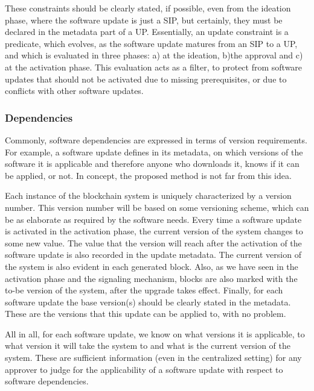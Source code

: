 These constraints should be clearly stated, if possible, even from the ideation phase, where the software update is just a SIP, but certainly, they must be declared in the metadata part of a UP. Essentially, an update  constraint is a predicate, which evolves, as the software update matures from an SIP to a UP,  and which is evaluated in three phases: a) at the ideation, b)the approval and c) at the activation phase. This evaluation acts as a filter, to protect from software updates that should not be activated due to missing prerequisites, or due to conflicts with other software updates.

\subsubsection{Dependencies}
Commonly, software dependencies are expressed in terms of version requirements. For example, a software update defines in its metadata, on which versions of the software it is applicable and therefore anyone who downloads it, knows if it can be applied, or not. In concept, the proposed method is not far from this idea.

Each instance of the blockchain system is uniquely characterized by a version number. This version number will be based on some versioning scheme, which can be as elaborate as required by the software needs. Every time a software update is activated in the activation phase, the current version of the system changes to some new value. The value that the version will reach after the activation of the software update is also recorded in the update metadata. The current version of the system is also evident in each generated block. Also, as we have seen in the activation phase and the signaling mechanism, blocks are also marked with the to-be version of the system, after the upgrade takes effect. Finally, for each software update the base version(s) should be clearly stated in the metadata. These are the versions that this update can be applied to, with no problem. 

All in all, for each software update, we know on what versions it is applicable, to what version it will take the system to and what is the current version of the system. These are sufficient information (even in the centralized setting) for any approver to judge for the applicability of a software update with respect to software dependencies.

%
%

